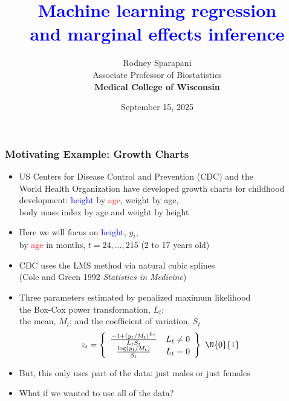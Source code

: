 \documentclass[11pt,dvipsnames,usenames,times]{beamer}
\title{\textcolor{blue}{Machine learning regression \\ 
and marginal effects inference}}
\author{Rodney Sparapani\\
Associate Professor of Biostatistics\\
\textcolor{PineGreen}{\bf Medical College of Wisconsin}
}
\date{
September 15, 2025
}
\newcommand*{\red}[1]{\textcolor{red}{#1}}%
\newcommand*{\blue}[1]{\textcolor{blue}{#1}}%
\begin{document}
\titlepage
\begin{comment}
\begin{quote}
Funding for this research was provided, in part, by\\
the National Marrow Donor Program/Be the Match,\\
and the Office of Naval Research
\end{quote}
\end{comment}
\boldmath

\begin{frame}%
\begin{center}
\end{center}
\end{frame}

\begin{frame}\frametitle{Motivating Example: Growth Charts}
\begin{itemize}
\item US Centers for Disease Control and Prevention (CDC) and the\\
  World Health Organization have developed growth charts for childhood
  development: \blue{height} by \red{age}, weight by age,\\ 
body mass index by age and weight by height
\item Here we will focus on \textcolor{blue}{height}, $y_t$,\\ 
by \textcolor{red}{age} in months, $t=24, \dots, 215$ (2 to 17 years old)
\item CDC uses the LMS method via natural cubic splines \\
(Cole and Green 1992 {\it Statistics in Medicine})
\item Three parameters estimated by penalized maximum likelihood \\
the Box-Cox power transformation, $L_t$;\\ the mean, $M_t$; and
the coefficient of variation, $S_t$
\begin{align*}
z_t & = \left\{\begin{array}{cc} 
\frac{-1+(y_t/M_t)^{L_t}}{L_t S_t} & L_t \not= 0 \\
\frac{\log(y_t/M_t)}{S_t} &  L_t = 0 \end{array} 
\right\} ~\N{0}{1} 
\end{align*}
\item But, this only uses part of the data: just males or just females
\item What if we wanted to use all of the data?

\end{itemize}
\end{frame}
\end{document}

